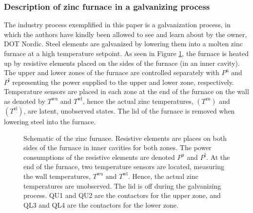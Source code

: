 \documentclass[lettersize,journal]{IEEEtran}
\begin{document}
\subsubsection{Description of zinc furnace in a galvanizing process}

The industry process exemplified in this paper is a galvanization process, in which the authors have kindly been allowed to see and learn about by the owner, DOT Nordic. Steel elements are galvanized by lowering them into a molten zinc furnace at a high temperature setpoint. As seen in Figure \ref{fig:furnace_schematic_tikz}, the furnace is heated up by resistive elements placed on the sides of the furnace (in an inner cavity). The upper and lower zones of the furnace are controlled separately with $P^{\text{u}}$ and $P^{\text{l}}$ representing the power supplied to the upper and lower zone, respectively. Temperature sensors are placed in each zone at the end of the furnace on the wall as denoted by $T^{\text{wu}}$ and $T^{\text{wl}}$, hence the actual zinc temperatures, $(T^{\text{zu}})$ and $(T^{\text{zl}})$, are latent, unobserved states. The lid of the furnace is removed when lowering steel into the furnace.

\begin{figure}[t]
    \centering
    
    \caption{Schematic of the zinc furnace. Resistive elements are places on both sides of the furnace in inner cavities for both zones. The power consumptions of the resistive elements are denoted $P^{\text{u}}$ and $P^{\text{l}}$. At the end of the furnace, two temperature sensors are located, measuring the wall temperatures, $T^{\text{wu}}$ and $T^{\text{wl}}$. Hence, the actual zinc temperatures are unobserved. The lid is off during the galvanizing process. QU1 and QU2 are the contactors for the upper zone, and QL3 and QL4 are the contactors for the lower zone.}
    \label{fig:furnace_schematic_tikz}
\end{figure}
\end{document}
